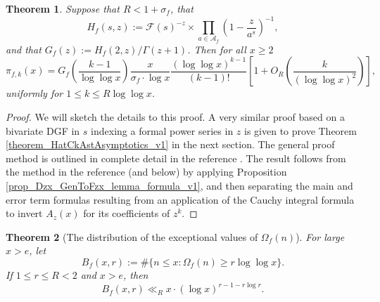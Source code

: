 \documentclass[11pt,reqno,a4letter]{article}
\numberwithin{figure}{section}
\numberwithin{table}{section}
\theoremstyle{plain}
\newtheorem{theorem}{Theorem}
\numberwithin{theorem}{section}
\theoremstyle{definition}
\begin{document}
\begin{theorem}
Suppose that $R < 1 + \sigma_f$, that 
\[
H_f(s, z) := \mathcal{F}(s)^{-z} \times \prod_{a \in \mathcal{A}_f} \left(1 - \frac{z}{a^s}\right)^{-1}, 
\]
and that $G_f(z) := H_f(2, z) / \Gamma(z+1)$. Then for all $x \geq 2$ 
\[
\pi_{f,k}(x) = G_f\left(\frac{k-1}{\log\log x}\right) \frac{x}{\sigma_f \cdot \log x} 
     \frac{(\log\log x)^{k-1}}{(k-1)!} \left[ 
     1 + O_R\left(\frac{k}{(\log\log x)^2}\right)\right], 
\]
uniformly for $1 \leq k \leq R \log\log x$. 
\end{theorem}
\begin{proof}
We will sketch the details to this proof. A very similar proof based on a bivariate 
DGF in $s$ indexing a formal power series in $z$ is given 
to prove Theorem \ref{theorem_HatCkAstAsymptotics_v1} in the next section. 
The general proof method is outlined in complete detail in the reference 
\cite[\S 7.4]{MV}. The result follows from the method in the reference (and below) 
by applying Proposition \ref{prop_Dzx_GenToFzx_lemma_formula_v1}, and then 
separating the main and error term formulas resulting from an application of the 
Cauchy integral formula to invert $A_z(x)$ for its coefficients of $z^k$. 
\end{proof}

\begin{theorem}[The distribution of the exceptional values of $\Omega_f(n)$]
For large $x > e$, let 
\[
B_f(x, r) := \#\{n \leq x: \Omega_f(n) \geq r \log\log x\}. 
\]
If $1 \leq r \leq R < 2$ and $x > e$, then 
\[
B_f(x, r) \ll_R x \cdot (\log x)^{r-1-r\log r}. 
\]
\end{theorem}
\end{document}

